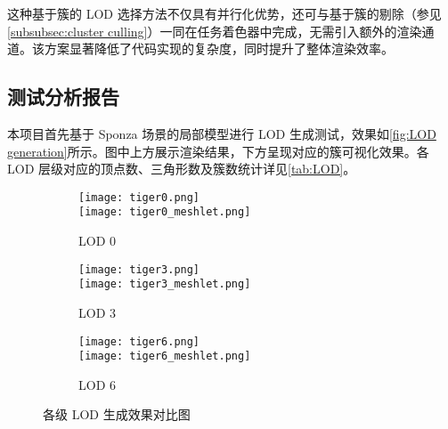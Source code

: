 这种基于簇的 LOD 选择方法不仅具有并行化优势，还可与基于簇的剔除（参见\ref{subsubsec:cluster culling}）一同在任务着色器中完成，无需引入额外的渲染通道。该方案显著降低了代码实现的复杂度，同时提升了整体渲染效率。

\subsection{测试分析报告}

本项目首先基于 Sponza 场景的局部模型进行 LOD 生成测试，效果如\autoref{fig:LOD generation}所示。图中上方展示渲染结果，下方呈现对应的簇可视化效果。各 LOD 层级对应的顶点数、三角形数及簇数统计详见\autoref{tab:LOD}。


\begin{figure*}[h]
    \centering
    \begin{subfigure}[t]{0.32\linewidth}
        \centering
        \texttt{[image: tiger0.png]}\\
        \vspace{0.1cm}
        \texttt{[image: tiger0\_meshlet.png]}
        \caption{LOD 0}
    \end{subfigure}%
    \hfill
    \begin{subfigure}[t]{0.32\linewidth}
        \centering
        \texttt{[image: tiger3.png]}\\
        \vspace{0.1cm}
        \texttt{[image: tiger3\_meshlet.png]}
        \caption{LOD 3}
    \end{subfigure}%
    \hfill
    \begin{subfigure}[t]{0.32\linewidth}
        \centering
        \texttt{[image: tiger6.png]}\\
        \vspace{0.1cm}
        \texttt{[image: tiger6\_meshlet.png]}
        \caption{LOD 6}
    \end{subfigure}
    \caption{各级 LOD 生成效果对比图}
    \label{fig:LOD generation}
\end{figure*}

